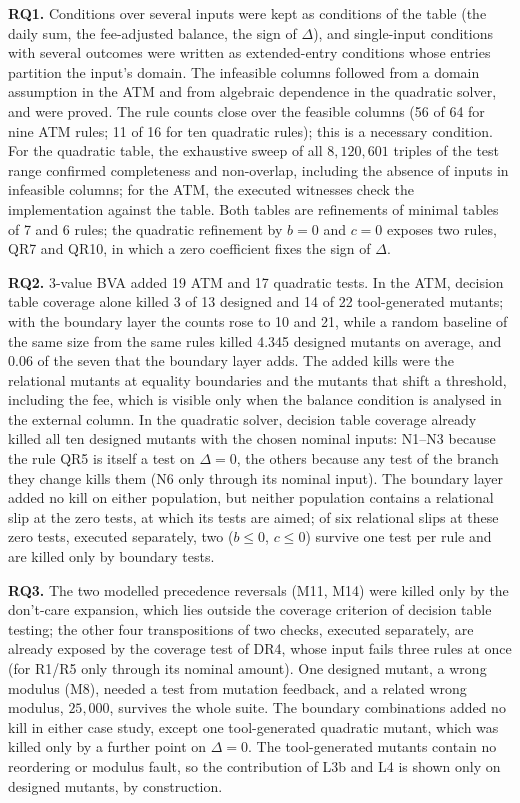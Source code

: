 \documentclass[11pt,a4paper]{article}
\begin{document}
\textbf{RQ1.} Conditions over several inputs were kept as conditions of the
table (the daily sum, the fee-adjusted balance, the sign of \(\Delta\)), and
single-input conditions with several outcomes were written as extended-entry
conditions whose entries partition the input's domain. The infeasible
columns followed from a domain assumption in the ATM and from algebraic
dependence in the quadratic solver, and were proved. The rule counts close
over the feasible columns (56 of 64 for nine ATM rules; 11 of 16 for ten
quadratic rules); this is a necessary condition. For the quadratic table, the exhaustive sweep of all \(8{,}120{,}601\) triples of the test range confirmed completeness and non-overlap, including the absence of inputs in infeasible columns; for the ATM, the executed witnesses check the implementation against the table. Both tables are refinements of minimal tables of 7 and 6
rules; the quadratic refinement by \(b=0\) and \(c=0\) exposes two rules,
QR7 and QR10, in which a zero coefficient fixes the sign of \(\Delta\).

\textbf{RQ2.} 3-value BVA added 19 ATM and 17 quadratic tests. In the ATM,
decision table coverage alone killed 3 of 13 designed and 14 of 22
tool-generated mutants; with the boundary layer the counts rose to 10 and 21,
while a random baseline of the same size from the same rules killed 4.345
designed mutants on average, and 0.06 of the seven that the boundary layer
adds. The added kills were the relational mutants at
equality boundaries and the mutants that shift a threshold, including the
fee, which is visible only when the balance condition is analysed in the
external column. In the quadratic solver, decision table coverage already
killed all ten designed mutants with the chosen nominal inputs: N1--N3 because the rule QR5 is itself a test on \(\Delta=0\), the others because any test of the branch they change kills them (N6 only through its nominal input). The boundary layer added
no kill on either population, but neither population contains a relational slip at the zero tests, at which its tests are aimed; of six relational slips at these zero tests, executed separately, two (\(b\le0\), \(c\le0\)) survive one test per rule and are killed only by boundary tests.

\textbf{RQ3.} The two modelled precedence reversals (M11, M14) were killed
only by the don't-care expansion, which lies outside the coverage criterion
of decision table testing; the other four transpositions of two checks,
executed separately, are already exposed by the coverage test of DR4, whose
input fails three rules at once (for R1/R5 only through its nominal amount). One designed mutant, a wrong modulus (M8),
needed a
test from mutation feedback, and a related wrong modulus, \(25{,}000\),
survives the whole suite. The boundary combinations added no kill in either
case study, except one tool-generated quadratic mutant, which was killed only
by a further point on \(\Delta=0\). The tool-generated mutants contain no
reordering or modulus fault, so the contribution of L3b and L4 is shown only
on designed mutants, by construction.
\end{document}
